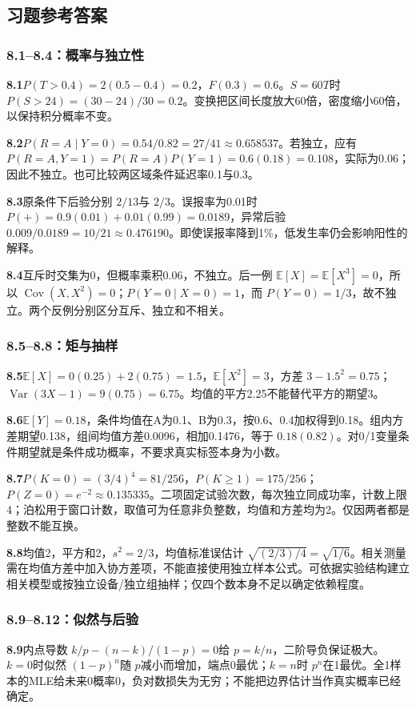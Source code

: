 \documentclass[UTF8,fontset=none,zihao=-4,a4paper]{ctexart}
\numberwithin{equation}{section}
\numberwithin{figure}{section}
\begin{document}
\clearpage
\subsection{习题参考答案}
\subsubsection*{8.1--8.4：概率与独立性}
\textbf{8.1}\quad $P(T>0.4)=2(0.5-0.4)=0.2$，$F(0.3)=0.6$。$S=60T$时 $P(S>24)=(30-24)/30=0.2$。变换把区间长度放大60倍，密度缩小60倍，以保持积分概率不变。

\textbf{8.2}\quad $P(R=A\mid Y=0)=0.54/0.82=27/41\approx0.658537$。若独立，应有 $P(R=A,Y=1)=P(R=A)P(Y=1)=0.6(0.18)=0.108$，实际为0.06；因此不独立。也可比较两区域条件延迟率0.1与0.3。

\textbf{8.3}\quad 原条件下后验分别 $2/13$与 $2/3$。误报率为0.01时 $P(+)=0.9(0.01)+0.01(0.99)=0.0189$，异常后验 $0.009/0.0189=10/21\approx0.476190$。即使误报率降到1\%，低发生率仍会影响阳性的解释。

\textbf{8.4}\quad 互斥时交集为0，但概率乘积0.06，不独立。后一例 $\mathbb E[X]=\mathbb E[X^3]=0$，所以 $\operatorname{Cov}(X,X^2)=0$；$P(Y=0\mid X=0)=1$，而 $P(Y=0)=1/3$，故不独立。两个反例分别区分互斥、独立和不相关。

\subsubsection*{8.5--8.8：矩与抽样}
\textbf{8.5}\quad $\mathbb E[X]=0(0.25)+2(0.75)=1.5$，$\mathbb E[X^2]=3$，方差 $3-1.5^2=0.75$；$\operatorname{Var}(3X-1)=9(0.75)=6.75$。均值的平方2.25不能替代平方的期望3。

\textbf{8.6}\quad $\mathbb E[Y]=0.18$，条件均值在A为0.1、B为0.3，按0.6、0.4加权得到0.18。组内方差期望0.138，组间均值方差0.0096，相加0.1476，等于 $0.18(0.82)$。对0/1变量条件期望就是条件成功概率，不要求真实标签本身为小数。

\textbf{8.7}\quad $P(K=0)=(3/4)^4=81/256$，$P(K\ge1)=175/256$；$P(Z=0)=e^{-2}\approx0.135335$。二项固定试验次数，每次独立同成功率，计数上限4；泊松用于窗口计数，取值可为任意非负整数，均值和方差均为2。仅因两者都是整数不能互换。

\textbf{8.8}\quad 均值2，平方和2，$s^2=2/3$，均值标准误估计 $\sqrt{(2/3)/4}=\sqrt{1/6}$。相关测量需在均值方差中加入协方差项，不能直接使用独立样本公式。可依据实验结构建立相关模型或按独立设备/独立组抽样；仅四个数本身不足以确定依赖程度。

\subsubsection*{8.9--8.12：似然与后验}
\textbf{8.9}\quad 内点导数 $k/p-(n-k)/(1-p)=0$给 $p=k/n$，二阶导负保证极大。$k=0$时似然 $(1-p)^n$随 $p$减小而增加，端点0最优；$k=n$时 $p^n$在1最优。全1样本的MLE给未来0概率0，负对数损失为无穷；不能把边界估计当作真实概率已经确定。
\end{document}
